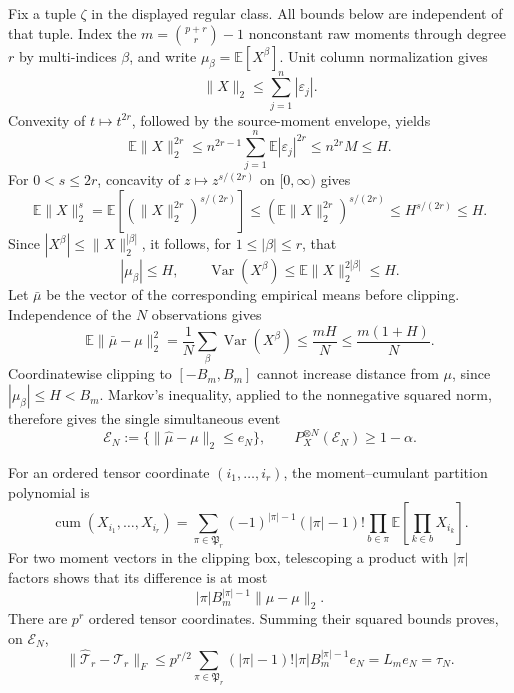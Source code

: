 Fix a tuple \(\zeta\) in the displayed regular class. All bounds below are independent of that tuple. Index the \(m=\binom{p+r}{r}-1\) nonconstant raw moments through degree \(r\) by multi-indices \(\beta\), and write \(\mu_\beta=\mathbb E[X^\beta]\). Unit column normalization gives
\[
 \lVert X\rVert_2\le\sum_{j=1}^n|\varepsilon_j|.
\]
Convexity of \(t\mapsto t^{2r}\), followed by the source-moment envelope, yields
\[
 \mathbb E\lVert X\rVert_2^{2r}
 \le n^{2r-1}\sum_{j=1}^n\mathbb E|\varepsilon_j|^{2r}
 \le n^{2r}M\le H.
\]
For \(0<s\le2r\), concavity of \(z\mapsto z^{s/(2r)}\) on \([0,\infty)\) gives
\[
 \mathbb E\lVert X\rVert_2^s
 =\mathbb E\!\left[(\lVert X\rVert_2^{2r})^{s/(2r)}\right]
 \le\left(\mathbb E\lVert X\rVert_2^{2r}\right)^{s/(2r)}
 \le H^{s/(2r)}\le H.
\]
Since \(|X^\beta|\le\lVert X\rVert_2^{|\beta|}\), it follows, for \(1\le|\beta|\le r\), that
\[
 |\mu_\beta|\le H,
 \qquad
 \operatorname{Var}(X^\beta)\le\mathbb E\lVert X\rVert_2^{2|\beta|}\le H.
\]
Let \(\bar\mu\) be the vector of the corresponding empirical means before clipping. Independence of the \(N\) observations gives
\[
 \mathbb E\lVert\bar\mu-\mu\rVert_2^2
 =\frac1N\sum_\beta\operatorname{Var}(X^\beta)
 \le\frac{mH}{N}\le\frac{m(1+H)}{N}.
\]
Coordinatewise clipping to \([-B_m,B_m]\) cannot increase distance from \(\mu\), since \(|\mu_\beta|\le H<B_m\). Markov's inequality, applied to the nonnegative squared norm, therefore gives the single simultaneous event
\[
 \mathcal E_N:=\{\lVert\widehat\mu-\mu\rVert_2\le e_N\},
 \qquad
 P_X^{\otimes N}(\mathcal E_N)\ge1-\alpha.
\]

For an ordered tensor coordinate \((i_1,\ldots,i_r)\), the moment--cumulant partition polynomial is
\[
 \operatorname{cum}(X_{i_1},\ldots,X_{i_r})
 =\sum_{\pi\in\mathfrak P_r}(-1)^{|\pi|-1}(|\pi|-1)!
   \prod_{b\in\pi}\mathbb E\!\left[\prod_{k\in b}X_{i_k}\right].
\]
For two moment vectors in the clipping box, telescoping a product with \(|\pi|\) factors shows that its difference is at most
\[
 |\pi|B_m^{|\pi|-1}\lVert\widehat\mu-\mu\rVert_2.
\]
There are \(p^r\) ordered tensor coordinates. Summing their squared bounds proves, on \(\mathcal E_N\),
\[
 \lVert\widehat{\mathcal T}_r-\mathcal T_r\rVert_F
 \le p^{r/2}\sum_{\pi\in\mathfrak P_r}(|\pi|-1)!|\pi|B_m^{|\pi|-1}e_N
 =L_me_N=\tau_N.
\]

